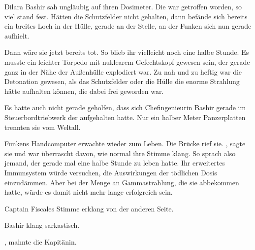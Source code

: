 Dilara Bashir sah ungläubig auf ihren Dosimeter. Die  war getroffen worden, so viel stand fest. Hätten die Schutzfelder nicht gehalten, dann befände sich bereits ein breites Loch in der Hülle, gerade an der Stelle, an der Funken sich nun gerade aufhielt.

\par

Dann wäre sie jetzt bereits tot. So blieb ihr vielleicht noch eine halbe Stunde. Es musste ein leichter Torpedo mit nuklearem Gefechtskopf gewesen sein, der gerade ganz in der Nähe der Außenhülle explodiert war. Zu nah und zu heftig war die Detonation gewesen, als das Schutzfelder oder die Hülle die enorme Strahlung hätte aufhalten können, die dabei frei geworden war.

\par

Es hatte auch nicht gerade geholfen, dass sich Chefingenieurin Bashir gerade im Steuerbordtriebwerk der  aufgehalten hatte. Nur ein halber Meter Panzerplatten trennten sie vom Weltall.

\par

Funkens Handcomputer erwachte wieder zum Leben. Die Brücke rief sie. , sagte sie und war überrascht davon, wie normal ihre Stimme klang. So sprach also jemand, der gerade mal eine halbe Stunde zu leben hatte. Ihr erweitertes Immunsystem würde versuchen, die Auswirkungen der tödlichen Dosis einzudämmen. Aber bei der Menge an Gammastrahlung, die sie abbekommen hatte, würde es damit nicht mehr lange erfolgreich sein.

\par

Captain Fiscales Stimme erklang von der anderen Seite. 

\par

 Bashir klang sarkastisch. 

\par

, mahnte die Kapitänin. 

